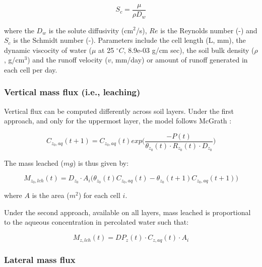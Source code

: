 \documentclass[]{article}
\begin{document}
\begin{equation}
S_c = \frac{ \mu}{\rho D_w}
\label{eq:S_c}
\end{equation}

where the \(D_w\) is the solute diffusivity (cm\(^2\)/s), \(Re\) is the
Reynolds number (-) and \(S_c\) is the Schmidt number (-). Parameters
include the cell length (L, mm), the dynamic viscocity of water (\(\mu\)
at 25 \(^\circ C\), 8.9e-03 g/cm sec), the soil bulk density (\(\rho\),
g/cm\(^3\)) and the runoff velocity (\(v\), mm/day) or amount of runoff
generated in each cell per day.

\hypertarget{vertical-mass-flux-i.e.-leaching}{%
\subsubsection{Vertical mass flux (i.e.,
leaching)}\label{vertical-mass-flux-i.e.-leaching}}

Vertical flux can be computed differently across soil layers. Under the
first approach, and only for the uppermost layer, the model follows
McGrath \citeyearpar{Mcgrath2008}:

\begin{equation}
C_{z_0,aq}(t+1) = C_{z_0,aq}(t) exp \Big( \frac{ -P(t) }{ \theta_{z_0}(t) \cdot R_{z_0}(t) \cdot D_{z_0} } \Big) 
\label{eq:conc_mcgrath}
\end{equation}

The mass leached (\(mg\)) is thus given by:

\begin{equation}
M_{z_0,lch}(t) =  D_{z_0} \cdot A_i  \Big(\theta_{z_0}(t)C_{z_0,aq}(t)- \theta_{z_0}(t+1) C_{z_0,aq}(t+1) \Big) 
\label{eq:leached_mcgrath}
\end{equation}

where \(A\) is the area (\(m^2\)) for each cell \(i\).

Under the second approach, available on all layers, mass leached is
proportional to the aqueous concentration in percolated water such that:

\begin{equation}
M_{z,lch}(t) = DP_z(t) \cdot C_{z,aq }(t) \cdot A_i
\label{eq:leached_prop}
\end{equation}

\hypertarget{lateral-mass-flux}{%
\subsubsection{Lateral mass flux}\label{lateral-mass-flux}}
\end{document}
